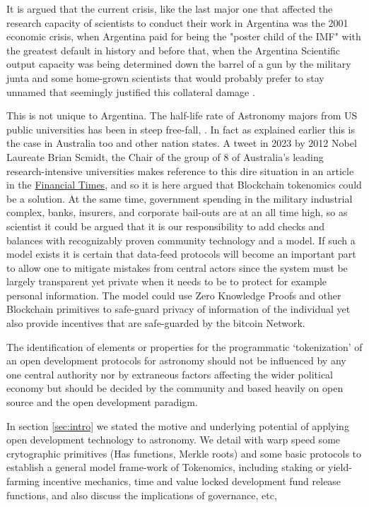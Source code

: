 \documentclass[final,5p,times,twocolumn,authoryear]{elsarticle}
\begin{document}
It is argued that the current crisis, like the last major one that affected the research capacity of scientists to conduct their work in Argentina was the 2001 economic crisis, when Argentina paid for being the "poster child of the IMF" with the greatest default in history and before that, when the Argentina Scientific output capacity was being determined down the barrel of a gun by the military junta and some home-grown scientists that would probably prefer to stay unnamed that seemingly justified this collateral damage \cite{levato1976}.

This is not unique to Argentina. The half-life rate of Astronomy majors from US public universities has been in steep free-fall,  \cite{milo_2018}. In fact as explained earlier this is the case in Australia too and other nation states. A tweet in 2023 by 2012 Nobel Laureate Brian Scmidt, the Chair of the group of 8 of Australia's  leading research-intensive universities makes reference to this dire situation in an article in the \href{https://t.co/RUEENvowqw}{Financial Times}, and so it is here argued that Blockchain tokenomics could be a solution.  At the same time, government spending in the military industrial complex, banks, insurers, and corporate bail-outs are at an all time high, so as scientist it could be argued that it is our responsibility to add checks and balances with recognizably proven community technology and a model. 
%
If such a model exists it is certain that data-feed protocols will become an important part to allow one to mitigate mistakes from central actors since the system must be largely transparent yet private when it needs to be to protect for example personal information. The model could use Zero Knowledge Proofs and other Blockchain primitives to safe-guard privacy of information of the individual yet also provide incentives that are safe-guarded by the bitcoin Network. 
   
The identification of elements or properties for the programmatic `tokenization' of an open development protocols for astronomy should not be influenced by any one central authority nor by extraneous factors affecting the wider political economy but should be decided by the community and based heavily on open source and the open development paradigm. 
   
In section \ref{sec:intro} we stated the motive and underlying potential of applying open development technology to astronomy. We detail with warp speed some crytographic primitives (Has functions, Merkle roots) and some basic protocols to establish a general model frame-work of Tokenomics, including staking or yield-farming incentive mechanics, time and value locked development fund release functions, and also discuss the implications of governance, etc,
\end{document}
